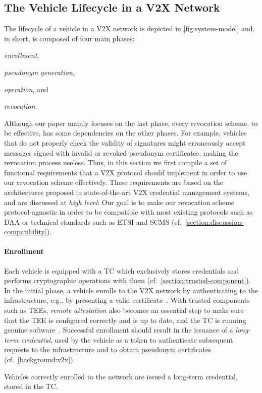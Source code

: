 \subsection{The Vehicle Lifecycle in a V2X Network}
\label{section:system-model}

The lifecycle of a vehicle in a \ac{V2X} network is depicted in
\cref{fig:system-model} and, in short, is composed of four main phases:
%
\begin{paraenum}
    \item \emph{enrollment},
    \item \emph{pseudonym generation},
    \item \emph{operation}, and
    \item \emph{revocation}.
\end{paraenum}
%
Although our paper mainly focuses on the last phase, every revocation scheme, to
be effective, has some dependencies on the other phases. For example, vehicles
that do not properly check the validity of signatures might erroneously accept
messages signed with invalid or revoked pseudonym certificates, making the
revocation process useless. Thus, in this section we first compile a set of
functional requirements that a \ac{V2X} protocol should implement in order to
use our revocation scheme effectively. These requirements are based on the
architectures proposed in state-of-the-art \ac{V2X} credential management
systems, and are discussed at \emph{high level}: Our goal is to make our
revocation scheme protocol-agnostic in order to be compatible with most existing
protocols such as \ac{DAA} or technical standards such as ETSI and SCMS
(cf.~\cref{section:discussion-compatibility}).

\paragraph{Enrollment} 

Each vehicle is equipped with a \ac{TC} which exclusively stores credentials and
performs cryptographic operations with them
(cf.~\cref{section:trusted-component}). In the initial phase, a vehicle enrolls
to the \ac{V2X} network by authenticating to the infrastructure, e.g., by
presenting a valid certificate~\cite{etsi2022102941}. With trusted components
such as \acp{TEE}, \emph{remote attestation} also becomes an essential step to
make sure that the \ac{TEE} is configured correctly and is up to date, and the
\ac{TC} is running genuine software~\cite{schneider2022hardware}. Successful
enrollment should result in the issuance of a \emph{long-term credential}, used
by the vehicle as a token to authenticate subsequent requests to the
infrastructure and to obtain pseudonym certificates (cf.~\cref{background:v2x}).
%
\begin{req}
    \label{req:enrollment}
 Vehicles correctly enrolled to the network are issued a long-term credential,
 stored in the \ac{TC}.
\end{req}
%

